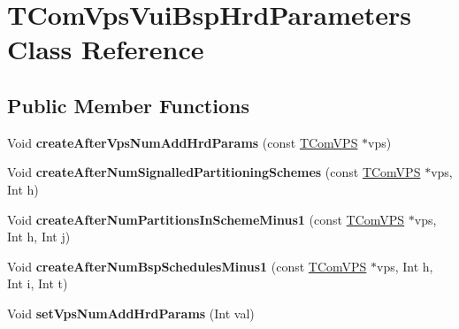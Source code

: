 \hypertarget{class_t_com_vps_vui_bsp_hrd_parameters}{}\section{T\+Com\+Vps\+Vui\+Bsp\+Hrd\+Parameters Class Reference}
\label{class_t_com_vps_vui_bsp_hrd_parameters}
\subsection*{Public Member Functions}
\begin{DoxyCompactItemize}
\item 
\mbox{\label{class_t_com_vps_vui_bsp_hrd_parameters_ae54b7b2b786956afb6f22e9733a36e95}} 
Void {\bfseries create\+After\+Vps\+Num\+Add\+Hrd\+Params} (const \hyperlink{class_t_com_v_p_s}{T\+Com\+V\+PS} $\ast$vps)
\item 
\mbox{\label{class_t_com_vps_vui_bsp_hrd_parameters_aa99134bc504f8c461fa9b9103c22482d}} 
Void {\bfseries create\+After\+Num\+Signalled\+Partitioning\+Schemes} (const \hyperlink{class_t_com_v_p_s}{T\+Com\+V\+PS} $\ast$vps, Int h)
\item 
\mbox{\label{class_t_com_vps_vui_bsp_hrd_parameters_ac4cb25cf9afb5f4ea84ff872726c83bd}} 
Void {\bfseries create\+After\+Num\+Partitions\+In\+Scheme\+Minus1} (const \hyperlink{class_t_com_v_p_s}{T\+Com\+V\+PS} $\ast$vps, Int h, Int j)
\item 
\mbox{\label{class_t_com_vps_vui_bsp_hrd_parameters_af1d7262b11fa271f51e6d52d666ef7f0}} 
Void {\bfseries create\+After\+Num\+Bsp\+Schedules\+Minus1} (const \hyperlink{class_t_com_v_p_s}{T\+Com\+V\+PS} $\ast$vps, Int h, Int i, Int t)
\item 
\mbox{\label{class_t_com_vps_vui_bsp_hrd_parameters_ae67c8d09e1117de3bbd42308dba2f82f}} 
Void {\bfseries set\+Vps\+Num\+Add\+Hrd\+Params} (Int val)
\item 
\mbox{\label{class_t_com_vps_vui_bsp_hrd_parameters_a8ba192f0c6929c383aa2a1795e947247}} 

\end{DoxyCompactItemize}
